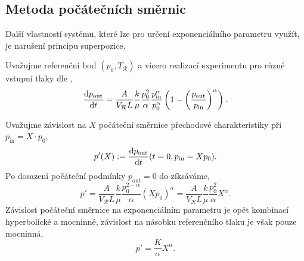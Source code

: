 \subsection{Metoda počátečních směrnic}\label{sss:metoda_pocatecnich_smernic}
Další vlastností systému, které lze pro určení exponenciálního parametru využít, je narušení principu superpozice. 

Uvažujme referenční bod $(p_0, T_\mathcal{R})$ a vícero realizací experimentu pro různé vstupní tlaky dle ,
\begin{equation}\label{eq:ei_nonnormalized_system}
    \frac{\mathrm{d} p_{\mathcal{\mathrm{out}}}}{\mathrm{d} t}
    =\frac{A}{V_{\mathcal{R}}L}\frac{k}{\mu}\frac{p_0^{2}}{\alpha}\frac{p_{\mathrm{in}}^{\alpha}}{p_0^{\alpha}}\left(1-\left(\frac{p_{\mathrm{out}}}{p_{\mathrm{in}}}\right)^{\alpha}\right).
\end{equation}

Uvažujme závislost na $X$ počáteční směrnice přechodové charakteristiky při $p_\mathrm{in}=X\cdot p_0$,
\begin{equation}
    p'(X):=\frac{\mathrm{d} p_{\mathrm{out}}}{\mathrm{d} t}(t=0, p_{\mathrm{in}}=Xp_0).
\end{equation}
Po dosazení počáteční podmínky $p_{\mathrm{out}}=0$ do  zíksáváme,
\begin{equation}
    p'=\frac{A}{V_{\mathcal{R}}L}\frac{k}{\mu}\frac{p_0^{2-\alpha}}{\alpha}\left(Xp_0\right)^\alpha=\frac{A}{V_{\mathcal{R}}L}\frac{k}{\mu}\frac{p_0^{2}}{\alpha}X^\alpha.
\end{equation}
Závislost počáteční směrnice na exponenciálním parametru je opět kombinací hyperbolické a mocninné, závislost na násobku referenčního tlaku je však pouze mocninná,
\begin{equation}
    p'=\frac{K}{\alpha}X^\alpha.
\end{equation}

